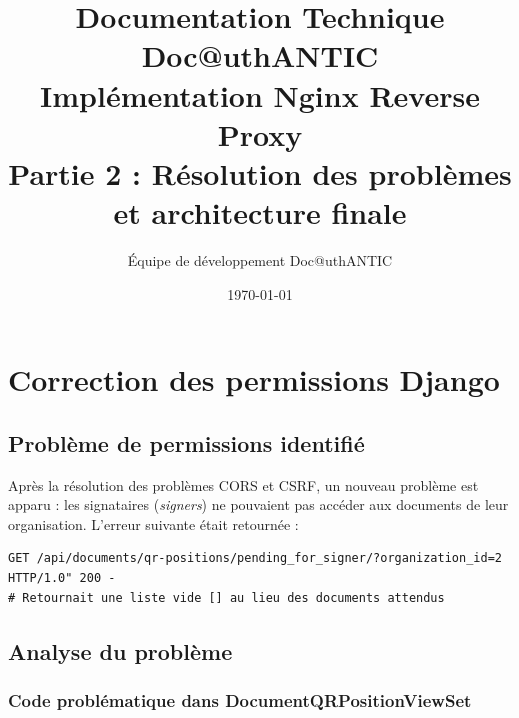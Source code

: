 \documentclass[12pt,a4paper]{article}
\begin{document}
\title{Documentation Technique Doc@uthANTIC\\Implémentation Nginx Reverse Proxy\\{\large Partie 2 : Résolution des problèmes et architecture finale}}
\author{Équipe de développement Doc@uthANTIC}
\date{\today}
\maketitle

\tableofcontents
\newpage


\section{Correction des permissions Django}

\subsection{Problème de permissions identifié}

Après la résolution des problèmes CORS et CSRF, un nouveau problème est apparu : les signataires (\textit{signers}) ne pouvaient pas accéder aux documents de leur organisation. L'erreur suivante était retournée :

\begin{lstlisting}[style=bash, caption={Erreur de permissions pour les signers}]
GET /api/documents/qr-positions/pending_for_signer/?organization_id=2 HTTP/1.0" 200 -
# Retournait une liste vide [] au lieu des documents attendus
\end{lstlisting}

\subsection{Analyse du problème}

\subsubsection{Code problématique dans DocumentQRPositionViewSet}
\end{document}
